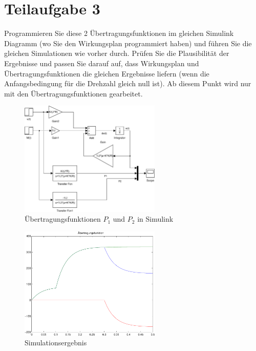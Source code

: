 \section{Teilaufgabe 3}
\begin{aufgabe}
    Programmieren Sie diese 2 Übertragungsfunktionen im gleichen Simulink 
    Diagramm (wo Sie den Wirkungsplan programmiert haben) und führen Sie die 
    gleichen Simulationen wie vorher durch. Prüfen Sie die Plausibilität der 
    Ergebnisse und passen Sie darauf auf, dass Wirkungsplan und 
    Übertragungsfunktionen die gleichen Ergebnisse liefern (wenn die 
    Anfangsbedingung für die Drehzahl gleich null ist). Ab diesem Punkt wird 
    nur mit den Übertragungsfunktionen gearbeitet.
\end{aufgabe}
\begin{figure}[h!]
    \centering
    \includegraphics[width=0.6\textwidth]{03/transfer.pdf}
    \caption{Übertragungsfunktionen $P_1$ und $P_2$ in Simulink}
    \label{fig:03}
\end{figure}
\begin{figure}[h!]
    \centering
    \includegraphics[width=0.6\textwidth]{03/transfer_plot.pdf}
    \caption{Simulationsergebnis}
    \label{fig:03plot}
\end{figure}

